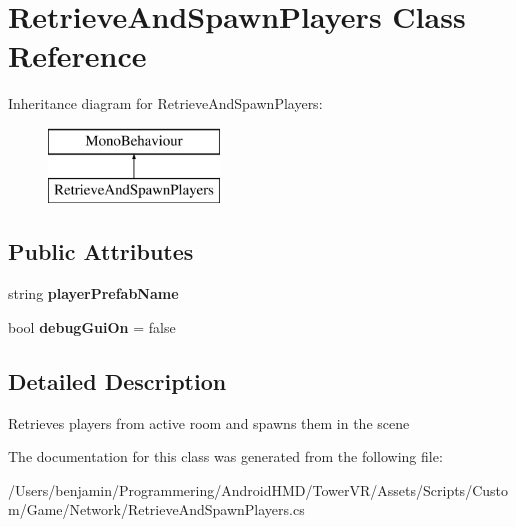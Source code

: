\hypertarget{class_retrieve_and_spawn_players}{}\section{Retrieve\+And\+Spawn\+Players Class Reference}
\label{class_retrieve_and_spawn_players}
Inheritance diagram for Retrieve\+And\+Spawn\+Players\+:\begin{figure}[H]
\begin{center}
\leavevmode
\includegraphics[height=2.000000cm]{class_retrieve_and_spawn_players}
\end{center}
\end{figure}
\subsection*{Public Attributes}
\begin{DoxyCompactItemize}
\item 
string {\bfseries player\+Prefab\+Name}\hypertarget{class_retrieve_and_spawn_players_a91e8dad7d15fe3bb0da9cf4be8b5a5bf}{}\label{class_retrieve_and_spawn_players_a91e8dad7d15fe3bb0da9cf4be8b5a5bf}

\item 
bool {\bfseries debug\+Gui\+On} = false\hypertarget{class_retrieve_and_spawn_players_a5c92cbcb63bda107ecef253968d28f40}{}\label{class_retrieve_and_spawn_players_a5c92cbcb63bda107ecef253968d28f40}

\end{DoxyCompactItemize}


\subsection{Detailed Description}
Retrieves players from active room and spawns them in the scene 

The documentation for this class was generated from the following file\+:\begin{DoxyCompactItemize}
\item 
/\+Users/benjamin/\+Programmering/\+Android\+H\+M\+D/\+Tower\+V\+R/\+Assets/\+Scripts/\+Custom/\+Game/\+Network/Retrieve\+And\+Spawn\+Players.\+cs\end{DoxyCompactItemize}
